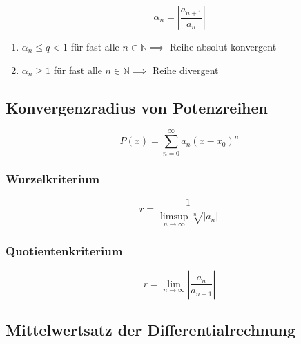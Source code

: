 \documentclass[twoside]{article}
\begin{document}
				\begin{displaymath}
					\alpha_n = |\frac{a_{n+1}}{a_{n}}|
				\end{displaymath}
				
				\begin{enumerate}[]
					\item \begin{math} \alpha_n \leq q < 1 \end{math} für fast alle \begin{math} n \in \mathbb{N} \implies \end{math} Reihe absolut konvergent
					\item \begin{math} \alpha_n \geq 1\end{math} für fast alle \begin{math} n \in \mathbb{N} \implies \end{math} Reihe divergent
				\end{enumerate}
	
		\subsection{Konvergenzradius von Potenzreihen}
		
			\begin{displaymath}
				P(x) = \sum_{n=0}^{\infty} a_{n}(x-x_0)^n
			\end{displaymath}
			
			\subsubsection{Wurzelkriterium}
			
				\begin{displaymath}
					r = \frac{1}{\limsup\limits_{n \to \infty} \sqrt[n]{|a_{n}|}}
				\end{displaymath}
				
			\subsubsection{Quotientenkriterium}
			
				\begin{displaymath}
					r = \lim\limits_{n \to \infty} |\frac{a_{n}}{a_{n+1}}|
				\end{displaymath}
		
		\subsection{Mittelwertsatz der Differentialrechnung}
		
\end{document}
